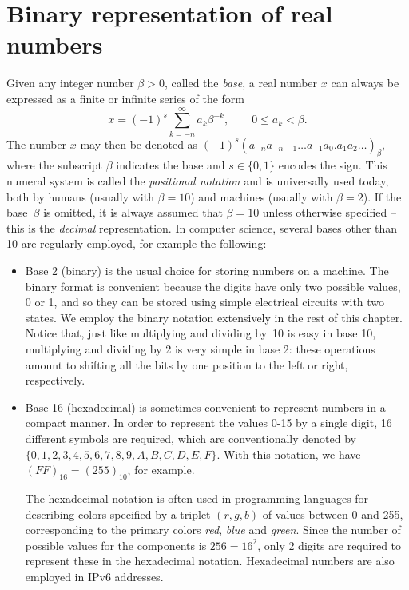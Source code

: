 \section{Binary representation of real numbers}%
\label{sec:binary_representation_of_real_numbers}

Given any integer number $\beta > 0$, called the \emph{base},
a real number $x$ can always be expressed as a finite or infinite series of the form
\begin{equation}
    \label{eq:base_representation}
    x = (-1)^s \sum_{k=-n}^{\infty} a_k \beta^{-k}, \qquad 0 \leq a_k < \beta.
\end{equation}
The number $x$ may then be denoted as $(-1)^s (a_{-n} a_{-n+1}\dots a_{-1} a_{0}.a_{1} a_{2} \dots)_{\beta}$,
where the subscript $\beta$ indicates the base and $s \in \{0, 1\}$ encodes the sign.
This numeral system is called the \emph{positional notation} and is universally used today,
both by humans (usually with $\beta=10$) and machines (usually with $\beta=2$).
If the base~$\beta$ is omitted,
it is always assumed that $\beta = 10$ unless otherwise specified
-- this is the \emph{decimal} representation.
In computer science, several bases other than 10 are regularly employed,
for example the following:
\begin{itemize}
    \item
        Base 2 (binary) is the usual choice for storing numbers on a machine.
        The binary format is convenient because the digits have only two possible values, 0 or 1,
        and so they can be stored using simple electrical circuits with two states.
        We employ the binary notation extensively in the rest of this chapter.
        Notice that, just like multiplying and dividing by~10 is easy in base 10,
        multiplying and dividing by 2 is very simple in base 2:
        these operations amount to shifting all the bits by one position to the left or right,
        respectively.

    \item
        Base 16 (hexadecimal) is sometimes convenient to represent numbers in a compact manner.
        In order to represent the values 0-15 by a single digit,
        16 different symbols are required, which are conventionally denoted by $\{0,1,2,3,4,5,6,7,8,9,A,B,C,D,E,F\}$.
        With this notation, we have $(FF)_{16} = (255)_{10}$, for example.

        The hexadecimal notation is often used in programming languages for describing colors specified by a triplet $(r,g,b)$ of values between 0 and 255,
        corresponding to the primary colors \emph{red}, \emph{blue} and \emph{green}.
        Since the number of possible values for the components is $256 = 16^2$,
        only 2 digits are required to represent these in the hexadecimal notation.
        Hexadecimal numbers are also employed in IPv6 addresses.
\end{itemize}

